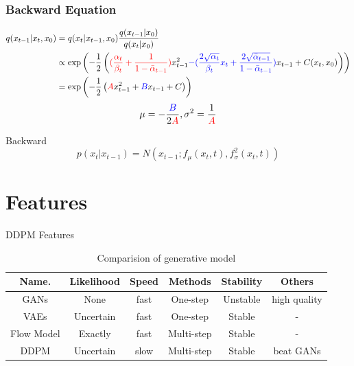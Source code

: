 \documentclass[aspectratio=169]{beamer}
\begin{document}
\begin{frame}
    \frametitle{Backward Equation}
    \begin{block}{}
        \begin{align*}
            q(x_{t-1} | x_t, x_0) & = q(x_t | x_{t-1}, x_0) \frac{q(x_{t-1}|x_0)}{q(x_t|x_0)} \\
                                  & \propto \exp\left(
            - \frac 12 \left(
            \textcolor{red} { (\frac{\alpha_t}{\beta_t}
                + \frac 1{1-\bar{\alpha}_{t-1}}) } x_{t-1}^2
            \textcolor{blue}{ - (\frac{2\sqrt{\alpha_t}}{\beta_t}x_t
                + \frac{2\sqrt{\bar{\alpha}_{t-1}}} {1-\bar{\alpha}_{t-1}} )} x_{t-1}
            +C(x_t, x_0) \right)
            \right)                                                                           \\
                                  & = \exp \left ( -\frac12
            \left ( \textcolor{red}{A} x_{t-1}^2 + \textcolor{blue}{B} x_{t-1} + C \right )
            \right )
        \end{align*}
        \begin{equation}
            \mu = -\frac{\textcolor{blue}{B}}{2\textcolor{red}{A}}, \sigma^2 = \frac {1}{\textcolor{red}{A}}
        \end{equation}
    \end{block}
    \begin{block}{Backward}
        \begin{equation}
            p(x_t|x_{t-1}) = N(x_{t-1};f_\mu(x_t, t),f_\sigma^2(x_t, t))
        \end{equation}
    \end{block}
\end{frame}

\section{Features}

\begin{frame}{DDPM Features}
    \begin{table}
        \begin{tabular}{| c || c | c | c | c | c |  }
            \hline
            Name.      & Likelihood & Speed & Methods    & Stability & Others       \\
            \hline \hline
            GANs       & None       & fast  & One-step   & Unstable  & high quality \\
            VAEs       & Uncertain  & fast  & One-step   & Stable    & -            \\
            Flow Model & Exactly    & fast  & Multi-step & Stable    & -            \\
            DDPM       & Uncertain  & slow  & Multi-step & Stable    & beat GANs    \\
            \hline
        \end{tabular}
        \caption{Comparision of generative model}
    \end{table}
\end{frame}
\end{document}
